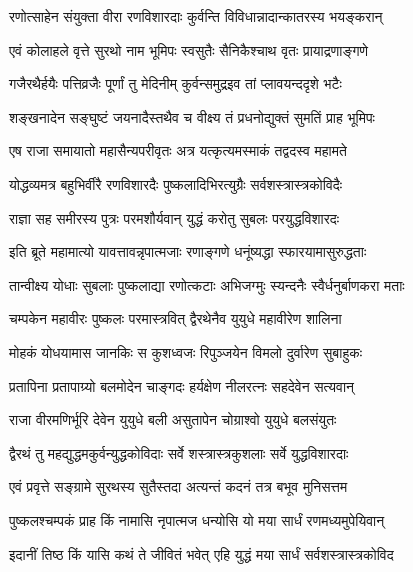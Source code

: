 \twolineshloka
{रणोत्साहेन संयुक्ता वीरा रणविशारदाः}
{कुर्वन्ति विविधान्नादान्कातरस्य भयङ्करान्}%

\twolineshloka
{एवं कोलाहले वृत्ते सुरथो नाम भूमिपः}
{स्वसुतैः सैनिकैश्चाथ वृतः प्रायाद्रणाङ्गणे}%

\twolineshloka
{गजैरथैर्हयैः पत्तिव्रजैः पूर्णां तु मेदिनीम्}
{कुर्वन्समुद्रइव तां प्लावयन्ददृशे भटैः}%

\twolineshloka
{शङ्खनादेन सङ्घुष्टं जयनादैस्तथैव च}
{वीक्ष्य तं प्रधनोद्युक्तं सुमतिं प्राह भूमिपः}%


\twolineshloka
{एष राजा समायातो महासैन्यपरीवृतः}
{अत्र यत्कृत्यमस्माकं तद्वदस्व महामते}%


\twolineshloka
{योद्धव्यमत्र बहुभिर्वीरै रणविशारदैः}
{पुष्कलादिभिरत्युग्रैः सर्वशस्त्रास्त्रकोविदैः}%

\twolineshloka
{राज्ञा सह समीरस्य पुत्रः परमशौर्यवान्}
{युद्धं करोतु सुबलः परयुद्धविशारदः}%


\twolineshloka
{इति ब्रूते महामात्यो यावत्तावन्नृपात्मजाः}
{रणाङ्गणे धनूंष्यद्धा स्फारयामासुरुद्धताः}%

\twolineshloka
{तान्वीक्ष्य योधाः सुबलाः पुष्कलाद्या रणोत्कटाः}
{अभिजग्मुः स्यन्दनैः स्वैर्धनुर्बाणकरा मताः}%

\twolineshloka
{चम्पकेन महावीरः पुष्कलः परमास्त्रवित्}
{द्वैरथेनैव युयुधे महावीरेण शालिना}%

\twolineshloka
{मोहकं योधयामास जानकिः स कुशध्वजः}
{रिपुञ्जयेन विमलो दुर्वारेण सुबाहुकः}%

\twolineshloka
{प्रतापिना प्रतापाग्र्यो बलमोदेन चाङ्गदः}
{हर्यक्षेण नीलरत्नः सहदेवेन सत्यवान्}%

\twolineshloka
{राजा वीरमणिर्भूरि देवेन युयुधे बली}
{असुतापेन चोग्राश्वो युयुधे बलसंयुतः}%

\twolineshloka
{द्वैरथं तु महद्युद्धमकुर्वन्युद्धकोविदाः}
{सर्वे शस्त्रास्त्रकुशलाः सर्वे युद्धविशारदाः}%

\twolineshloka
{एवं प्रवृत्ते सङ्ग्रामे सुरथस्य सुतैस्तदा}
{अत्यन्तं कदनं तत्र बभूव मुनिसत्तम}%

\twolineshloka
{पुष्कलश्चम्पकं प्राह किं नामासि नृपात्मज}
{धन्योसि यो मया सार्धं रणमध्यमुपेयिवान्}%

\twolineshloka
{इदानीं तिष्ठ किं यासि कथं ते जीवितं भवेत्}
{एहि युद्धं मया सार्धं सर्वशस्त्रास्त्रकोविद}%

